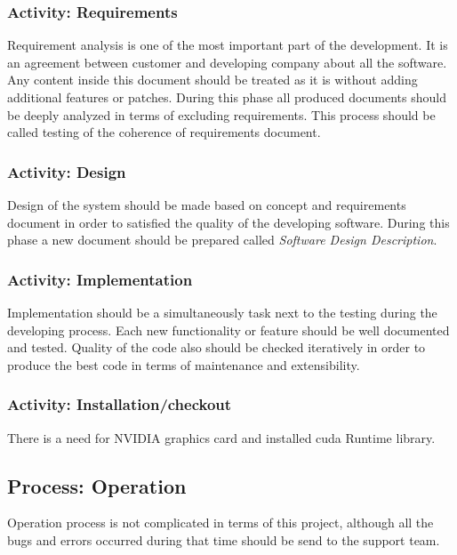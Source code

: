		\subsubsection{Activity: Requirements} \label{s:details-of-the-master-test-plan:activity-requirements}
		Requirement analysis is one of the most important part of the development. It is an agreement between customer and developing company about all the software. Any content inside this document should be treated as it is without adding additional features or patches. During this phase all produced documents should be deeply analyzed in terms of excluding requirements. This process should be called testing of the coherence of requirements document.
		\subsubsection{Activity: Design} \label{s:details-of-the-master-test-plan:activity-design}
		Design of the system should be made based on concept and requirements document in order to satisfied the quality of the developing software. During this phase a new document should be prepared called \emph{Software Design Description}.
		\subsubsection{Activity: Implementation} \label{s:details-of-the-master-test-plan:activity-implementation}
		Implementation should be a simultaneously task next to the testing during the developing process. Each new functionality or feature should be well documented and tested. Quality of the code also should be checked iteratively in order to produce the best code in terms of maintenance and extensibility. 
		\subsubsection{Activity: Installation/checkout} \label{s:details-of-the-master-test-plan:activity-installation-checkout}
		There is a need for NVIDIA graphics card and installed \gls{cuda} Runtime library.
	\subsection{Process: Operation} \label{s:details-of-the-master-test-plan:process-operation}
		Operation process is not complicated in terms of this project, although all the bugs and errors occurred during that time should be send to the support team. 
